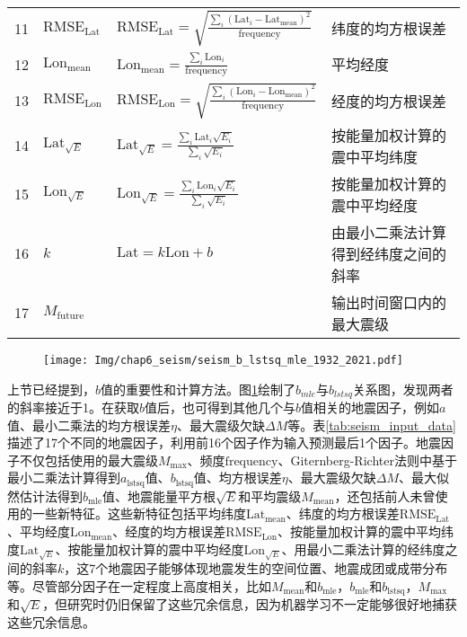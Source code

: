 \begin{sidewaystable}[htpb]
\begin{tabular}{llll}
    11 & $\text{RMSE}_{\text{Lat}}$ & $\displaystyle \text{RMSE}_{\text{Lat}}=\sqrt{\frac{\sum_i{(\text{Lat}_i-\text{Lat}_\text{mean})}^2}{\text{frequency}}}$ & 纬度的均方根误差 \\ 
    12 & $\text{Lon}_{\text{mean}}$ & $\displaystyle \text{Lon}_{\text{mean}}=\frac{\sum_i{\text{Lon}_i}}{\text{frequency}}$ & 平均经度\\ 
    13 & $\text{RMSE}_{\text{Lon}}$ & $\displaystyle \text{RMSE}_{\text{Lon}}=\sqrt{\frac{\sum_i{(\text{Lon}_i-\text{Lon}_\text{mean})}^2}{\text{frequency}}}$ &  经度的均方根误差 \\ 
    14 & $\text{Lat}_{\sqrt{E}}$ & $\displaystyle \text{Lat}_{\sqrt{E}}=\frac{\sum_i{\text{Lat}_i\sqrt{E_i}}}{\sum_i{\sqrt{E_i}}}$ & 按能量加权计算的震中平均纬度 \\ 
    15 & $\text{Lon}_{\sqrt{E}}$ & $\displaystyle \text{Lon}_{\sqrt{E}}=\frac{\sum_i{\text{Lon}_i\sqrt{E_i}}}{\sum_i{\sqrt{E_i}}}$ & 按能量加权计算的震中平均经度 \\ 
    16 & $k$ & $\text{Lat}=k\text{Lon}+b$ & 由最小二乘法计算得到经纬度之间的斜率 \\
    17 & $M_{\text{future}}$ & & 输出时间窗口内的最大震级 \\
    \bottomrule
  \end{tabular} 
\end{sidewaystable}

\begin{figure}[!htbp]
  \centering
  \texttt{[image: Img/chap6\_seism/seism\_b\_lstsq\_mle\_1932\_2021.pdf]}
  \vspace{-0.5cm}
  \label{fig:seism_b_lstsq_mle_1932_2021}
\end{figure}

上节已经提到，$b$值的重要性和计算方法。图\ref{fig:seism_b_lstsq_mle_1932_2021}绘制了$b_{mle}$与$b_{lstsq}$关系图，发现两者的斜率接近于1。在获取$b$值后，也可得到其他几个与$b$值相关的地震因子，例如$a$值、最小二乘法的均方根误差$\eta$、最大震级欠缺$\Delta M$等。表\ref{tab:seism_input_data}描述了17个不同的地震因子，利用前16个因子作为输入预测最后1个因子。地震因子不仅包括\citet{Panakkat2007Neural}使用的最大震级$M_{\max}$、频度$\text{frequency}$、Giternberg-Richter法则中基于最小二乘法计算得到$a_{\text{lstsq}}$值、$b_{\text{lstsq}}$值、均方根误差$\eta$、最大震级欠缺$\Delta M$、最大似然估计法得到$b_{\text{mle}}$值、地震能量平方根$\sqrt{E}$和平均震级$M_{\text{mean}}$，还包括前人未曾使用的一些新特征。这些新特征包括平均纬度$\text{Lat}_{\text{mean}}$、纬度的均方根误差$\text{RMSE}_{\text{Lat}}$、平均经度$\text{Lon}_{\text{mean}}$、经度的均方根误差$\text{RMSE}_{\text{Lon}}$、按能量加权计算的震中平均纬度$\text{Lat}_{\sqrt{E}}$、按能量加权计算的震中平均经度$\text{Lon}_{\sqrt{E}}$、用最小二乘法计算的经纬度之间的斜率$k$，这7个地震因子能够体现地震发生的空间位置、地震成团或成带分布等。尽管部分因子在一定程度上高度相关，比如$M_{\text{mean}}$和$b_{\text{mle}}$，$b_{\text{mle}}$和$b_{\text{lstsq}}$，$M_{\max}$和$\sqrt{E}$，但研究时仍旧保留了这些冗余信息，因为机器学习不一定能够很好地捕获这些冗余信息。

